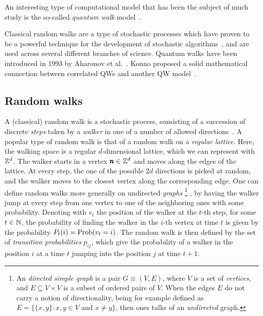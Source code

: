 An interesting type of computational model that has been the subject of much study is the so-called \textit{quantum walk} model~\cite{aharonov2000quantum,kempe2003quantum,venegas-andraca2012quantum,portugal2013quantum}.

Classical random walks are a type of stochastic processes which have proven to be a powerful technique for the development of stochastic algorithms~\cite{motwani1995randomized,schoning1999probabilistic}, and are used across several different branches of science.
Quantum walks have been introduced in 1993 by Aharonov et al.~\cite{aharonov1993quantum}.
Konno proposed a solid mathematical connection between correlated \acp{QW} and another QW model~\cite{konno2003limit}.

\subsection{Random walks}
A (classical) random walk is a stochastic process, consisting of a succession of discrete \textit{steps} taken by a \textit{walker} in one of a number of allowed directions~\cite{lovasz1993random}.
A popular type of random walk is that of a random walk on a \textit{regular lattice}. Here, the walking space is a regular $d$-dimensional lattice, which we can represent with $\mathbb{Z}^d$. The walker starts in a vertex $\pmb{n}\in\mathbb{Z}^d$ and moves along the edges of the lattice.
At every step, the one of the possible $2d$ directions is picked at random, and the walker moves to the closest vertex along the corresponding edge.
One can define random walks more generally on undirected \textit{graphs}
\footnote{An \textit{directed simple graph} is a pair $G\equiv (V,E)$, where $V$ is a set of \textit{vertices}, and $E\subseteq V\times V$ is a subset of ordered pairs of $V$. When the edges $E$ do not carry a notion of directionality, being for example defined as $E=\{\{x,y\} : x,y\in V\text{ and }x\neq y\}$, then ones talks of an \textit{undirected} graph.}
, by having the walker jump at every step from one vertex to one of the neighboring ones with some probability.
Denoting with $v_t$ the position of the walker at the $t$-th step, for some $t\in\mathbb{N}$, the probability of finding the walker in the $i$-th vertex at time $t$ is given by the probability
$P_t(i)=\operatorname*{Prob}(v_t=i)$. The random walk is then defined by the set of \textit{transition probabilities} $p_{ij}$, which give the probability of a walker in the position $i$ at a time $t$ jumping into the position $j$ at time $t+1$.
